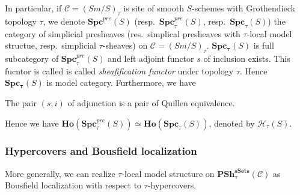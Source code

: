 \documentclass[b5paper,10pt]{article}
\begin{document}
In particular, if $\mathcal{C}=(Sm/S)_\tau$ is site of smooth $S$-schemes with Grothendieck topology $\tau$, we denote $\mathbf{Spc}^{pre}(S)$ (resp.\ $\mathbf{Spc}_\tau^{pre}(S)$, resp.\ $\mathbf{Spc}_\tau(S)$) the category of simplicial presheaves (res.\ simplical presheaves with $\tau$-local model structue, resp.\ simplicial $\tau$-sheaves) on $\mathcal{C}=(Sm/S)_\tau$. $\mathbf{Spc_\tau}(S)$ is full subcategory of $\mathbf{Spc}^{pre}_\tau(S)$ and left adjoint functor $s$ of inclusion exists. This fucntor is called is called \emph{sheafification functor} under topology $\tau$. Hence $\mathbf{Spc_\tau}(S)$ is model category. Furthermore, we have 
\begin{secprop}
	The pair $(s ,i)$ of adjunction is a pair of Quillen equivalence.
\end{secprop}
Hence we have $\mathbf{Ho}(\mathbf{Spc}_\tau^{pre}(S)) \simeq \mathbf{Ho}(\mathbf{Spc}_\tau(S))$, denoted by $\mathcal{H}_\tau(S)$.
\subsubsection{Hypercovers and Bousfield localization}
More generally, we can realize $\tau$-local model structure on $\mathbf{PSh^{sSets}_\tau}(\mathcal{C})$ as Bousfield localization with respect to $\tau$-hypercovers.
\end{document}
